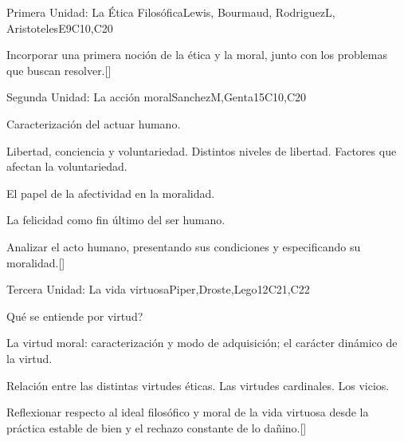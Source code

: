 \begin{syllabus}
\begin{unit}{}{Primera Unidad: La Ética Filosófica}{Lewis, Bourmaud, RodriguezL, AristotelesE}{9}{C10,C20}
\begin{topics}
\end{topics}
\begin{learningoutcomes}
	\item Incorporar una primera noción de la ética y la moral, junto con los problemas que buscan resolver.[\Familiarity]
\end{learningoutcomes}
\end{unit}

\begin{unit}{}{Segunda Unidad: La acción moral}{SanchezM,Genta}{15}{C10,C20}
\begin{topics}
    \item Caracterización del actuar humano.
    \item Libertad, conciencia y voluntariedad. Distintos niveles de libertad. Factores que afectan la voluntariedad.
    \item El papel de la afectividad en la moralidad.
    \item La felicidad como fin último del ser humano.

\end{topics}
\begin{learningoutcomes}
	\item Analizar el acto humano, presentando sus condiciones y especificando su moralidad.[\Familiarity]
\end{learningoutcomes}
\end{unit}

\begin{unit}{}{Tercera Unidad: La vida virtuosa}{Piper,Droste,Lego}{12}{C21,C22}
\begin{topics}
    \item Qué se entiende por virtud?
    \item La virtud moral: caracterización y modo de adquisición; el carácter dinámico de la virtud.
    \item Relación entre las distintas virtudes éticas. Las virtudes cardinales. Los vicios.
\end{topics}
\begin{learningoutcomes}
	\item Reflexionar respecto al ideal filosófico y moral de la vida virtuosa desde la práctica estable de bien y el rechazo constante de lo dañino.[\Familiarity]
\end{learningoutcomes}
\end{unit}


\end{syllabus}
